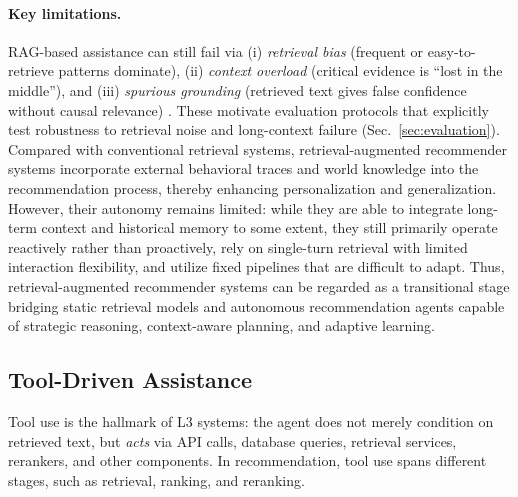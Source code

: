 {{\paragraph{\textbf{Key limitations.}}
RAG-based assistance can still fail via (i) \emph{retrieval bias} (frequent or easy-to-retrieve patterns dominate), (ii) \emph{context overload} (critical evidence is “lost in the middle”), and (iii) \emph{spurious grounding} (retrieved text gives false confidence without causal relevance) \cite{maragheh2025arag,sun2025retrieval,xu2025iagent,liu2024lost,lichtenberg2024large,sun2025cirr,zhang2025customizedretrievalaugmentedgenerationllm, tandon2025evaluating, sayana2025beyond, lin2025strajrag, cheng2025education, meng2025kerag_r}.
These motivate evaluation protocols that explicitly test robustness to retrieval noise and long-context failure (Sec.~\ref{sec:evaluation}).  
Compared with conventional retrieval systems, retrieval-augmented recommender systems incorporate external behavioral traces and world knowledge into the recommendation process, thereby enhancing personalization and generalization. 
However, their autonomy remains limited: while they are able to integrate long-term context and historical memory to some extent, they still primarily operate reactively rather than proactively, rely on single-turn retrieval with limited interaction flexibility, and utilize fixed pipelines that are difficult to adapt. 
Thus, retrieval-augmented recommender systems can be regarded as a transitional stage bridging static retrieval models and autonomous recommendation agents capable of strategic reasoning, context-aware planning, and adaptive learning. 


 

\subsection{Tool-Driven Assistance}
\label{sec:assist-tools}

{Tool use is the hallmark of L3 systems: the agent does not merely condition on retrieved text, but \emph{acts} via API calls, database queries, retrieval services, rerankers, and other components.
In recommendation, tool use spans different stages, such as retrieval, ranking, and reranking. 
}

}}
